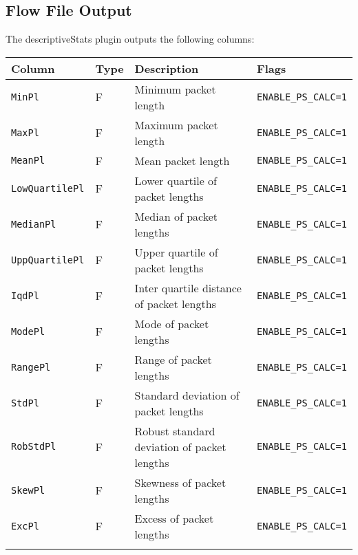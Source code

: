 \documentclass[documentation]{subfiles}
\begin{document}
\subsection{Flow File Output}
The descriptiveStats plugin outputs the following columns:
\begin{longtable}{llll}
    \toprule
    {\bf Column} & {\bf Type} & {\bf Description} & {\bf Flags}\\
    \midrule\endhead%
    {\tt MinPl}          & F & Minimum packet length                       & {\tt ENABLE\_PS\_CALC=1}\\
    {\tt MaxPl}          & F & Maximum packet length                       & {\tt ENABLE\_PS\_CALC=1}\\
    {\tt MeanPl}         & F & Mean packet length                          & {\tt ENABLE\_PS\_CALC=1}\\
    {\tt LowQuartilePl}  & F & Lower quartile of packet lengths            & {\tt ENABLE\_PS\_CALC=1}\\
    {\tt MedianPl}       & F & Median of packet lengths                    & {\tt ENABLE\_PS\_CALC=1}\\
    {\tt UppQuartilePl}  & F & Upper quartile of packet lengths            & {\tt ENABLE\_PS\_CALC=1}\\
    {\tt IqdPl}          & F & Inter quartile distance of packet lengths   & {\tt ENABLE\_PS\_CALC=1}\\
    {\tt ModePl}         & F & Mode of packet lengths                      & {\tt ENABLE\_PS\_CALC=1}\\
    {\tt RangePl}        & F & Range of packet lengths                     & {\tt ENABLE\_PS\_CALC=1}\\
    {\tt StdPl}          & F & Standard deviation of packet lengths        & {\tt ENABLE\_PS\_CALC=1}\\
    {\tt RobStdPl}       & F & Robust standard deviation of packet lengths & {\tt ENABLE\_PS\_CALC=1}\\
    {\tt SkewPl}         & F & Skewness of packet lengths                  & {\tt ENABLE\_PS\_CALC=1}\\
    {\tt ExcPl}          & F & Excess of packet lengths                    & {\tt ENABLE\_PS\_CALC=1}\\
    \\

\end{longtable}
\end{document}
